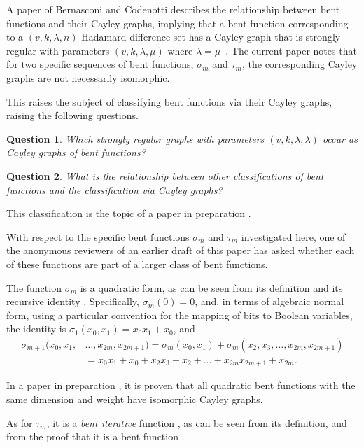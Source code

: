 \documentclass[11pt,a4paper]{jacodesmath}
\newtheorem{question}{Question}
\begin{document}
A paper of Bernasconi and Codenotti describes the relationship between bent functions and
their Cayley graphs, implying that a bent function corresponding to a $(v,k,\lambda,n)$ Hada\-mard
difference set has a Cayley graph
that is strongly regular with parameters $(v,k,\lambda,\mu)$ where $\lambda=\mu$~\cite[Lemma
12]{BerC99}.
The current paper notes that for two specific sequences of bent functions, $\sigma_m$ and $\tau_m$,
the corresponding Cayley graphs are not necessarily isomorphic.

This raises the subject of classifying bent functions via their Cayley graphs, raising the following
questions.
\begin{question}
Which strongly regular graphs with parameters $(v,k,\lambda,\lambda)$ occur as Cayley graphs of bent
functions?
\end{question}
\begin{question}
What is the relationship between other classifications of bent functions and the classification via
Cayley graphs?
\end{question}
This classification is the topic of a paper in preparation \cite{Leo16Classifying}.

With respect to the specific bent functions $\sigma_m$ and $\tau_m$ investigated here,
one of the anonymous reviewers of an earlier draft of this paper has asked whether each of these
functions are part of a larger class of bent functions.

The function $\sigma_m$ is a quadratic form, as can be seen from its definition and
its recursive identity \cite[Lemma 7]{Leo14Constructions}.
Specifically, $\sigma_m(0)=0$,
and, in terms of algebraic normal form,
using a particular convention for the mapping of bits to Boolean
variables, the identity is $\sigma_1(x_0,x_1)=x_0 x_1 + x_0$, and
\begin{align*}
\sigma_{m+1}(x_0,x_1,&\ldots,x_{2m},x_{2m+1})
=
\sigma_m(x_0,x_1) +
\sigma_m(x_2,x_3,\ldots,x_{2m},x_{2m+1})
\\
&= x_0 x_1 + x_0 + x_2 x_3 + x_2 + \ldots + x_{2m} x_{2m+1} + x_{2m}.
\end{align*}

In a paper in preparation \cite{Leo16Classifying},
it is proven that all quadratic bent functions with
the same dimension and weight have isomorphic Cayley graphs.

As for $\tau_m$, it is a \emph{bent iterative} function
\cite[Theorem~V.4]{CanCCP01cryptographic} \cite[Theorem~2]{CanC03decomposing} \cite{Tok11number},
as can be seen from its definition, and from the proof that it is a bent function
\cite[Theorem 3.1]{Leo15Twin}.
\end{document}
